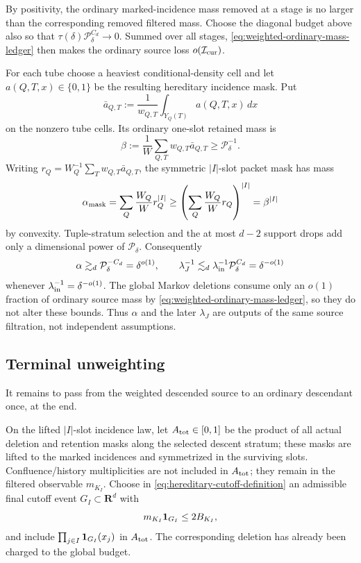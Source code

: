 \documentclass[11pt]{article}
\newcommand{\R}{\mathbf R}
\begin{document}
By positivity, the ordinary marked-incidence mass removed at a stage is no
larger than the corresponding removed filtered mass.  Choose the diagonal
budget above also so that
\(\tau(\delta)\mathcal P_\delta^{C_d}\to0\).  Summed over all stages,
\eqref{eq:weighted-ordinary-mass-ledger} then makes the ordinary source loss
\(o(\mathcal I_{\rm cur})\).

For each tube choose a heaviest conditional-density cell and let
\(a(Q,T,x)\in\{0,1\}\) be the resulting hereditary incidence mask.  Put
\[
 \bar a_{Q,T}
 :=\frac1{w_{Q,T}}\int_{Y_Q(T)}a(Q,T,x)\,dx
\]
on the nonzero tube cells.  Its ordinary
one-slot retained mass is
\[
 \beta
 :=\frac1W\sum_{Q,T}w_{Q,T}\bar a_{Q,T}
 \ge\mathcal P_\delta^{-1}.
\]
Writing
\(r_Q=W_Q^{-1}\sum_Tw_{Q,T}\bar a_{Q,T}\), the symmetric \(|I|\)-slot packet mask
has mass
\[
 \alpha_{\rm mask}
 =\sum_Q\frac{W_Q}{W}r_Q^{|I|}
 \ge
 \left(\sum_Q\frac{W_Q}{W}r_Q\right)^{|I|}
 =\beta^{|I|}
\]
by convexity.  Tuple-stratum selection and the at most \(d-2\) support drops
add only a dimensional power of \(\mathcal P_\delta\).  Consequently
\begin{equation}\label{eq:source-mass-ledger}
 \alpha\gtrsim_d\mathcal P_\delta^{-C_d}=\delta^{o(1)},
 \qquad
 \lambda_J^{-1}\lesssim_d
 \lambda_{\rm in}^{-1}\mathcal P_\delta^{C_d}=\delta^{-o(1)}
\end{equation}
whenever \(\lambda_{\rm in}^{-1}=\delta^{-o(1)}\).  The global Markov deletions
consume only an \(o(1)\) fraction of ordinary source mass by
\eqref{eq:weighted-ordinary-mass-ledger}, so they do not alter these bounds.
Thus \(\alpha\) and the later \(\lambda_J\) are outputs of the same source
filtration, not independent assumptions.

\subsection{Terminal unweighting}

It remains to pass from the weighted descended source to an ordinary
descendant once, at the end.

On the lifted \(|I|\)-slot incidence law, let
\(A_{\rm tot}\in[0,1]\) be the product of all actual deletion and retention
masks along the selected descent stratum; these masks are lifted to the
marked incidences and symmetrized in the surviving slots.  Confluence/history
multiplicities are not included in \(A_{\rm tot}\); they remain in the filtered
observable \(m_{K_I}\).  Choose in
\eqref{eq:hereditary-cutoff-definition} an admissible final cutoff event
\(G_I\subset\R^d\) with
\[
 m_{K_I}{\bf1}_{G_I}\le2B_{K_I},
\]
and include \(\prod_{j\in I}{\bf1}_{G_I}(x_j)\) in \(A_{\rm tot}\).
The corresponding deletion has already been charged to the global budget.
\end{document}
